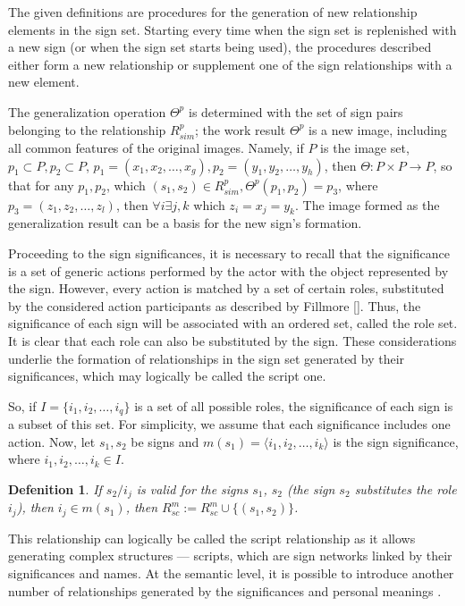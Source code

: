 \documentclass[review]{elsarticle}
\newtheorem{definition}{Defenition}
\begin{document}
The given definitions are procedures for the generation of new relationship elements in the sign set. Starting every time when the sign set is replenished with a new sign (or when the sign set starts being used), the procedures described either form a new relationship or supplement one of the sign relationships with a new element.

The generalization operation $\Theta^p$ is determined with the set of sign pairs belonging to the relationship $R^p_{sim}$; the work result $\Theta^p$ is a new image, including all common features of the original images. Namely, if $P$ is the image set, $p_1\subset P,p_2\subset P$, $p_1=(x_1,x_2,\dots,x_g), p_2=(y_1,y_2,\dots,y_h)$, then $\Theta:P\times P\rightarrow P$, so that for any $p_1,p_2$, which $(s_1,s_2)\in R^p_{sim}, \Theta^p(p_1,p_2)=p_3$, where $p_3=(z_1,z_2,\dots, z_l)$, then $\forall i\exists j,k$ which $z_i=x_j=y_k$. The image formed as the generalization result can be a basis for the new sign's formation.

Proceeding to the sign significances, it is necessary to recall that the significance is a set of generic actions performed by the actor with the object represented by the sign. However, every action is matched by a set of certain roles, substituted by the considered action participants as described by Fillmore []. Thus, the significance of each sign will be associated with an ordered set, called the role set. It is clear that each role can also be substituted by the sign. These considerations underlie the formation of relationships in the sign set generated by their significances, which may logically be called the script one.

So, if $I=\{i_1,i_2,\dots,i_q\}$ is a set of all possible roles, the significance of each sign is a subset of this set. For simplicity, we assume that each significance includes one action. Now, let $s_1, s_2$ be signs and $m(s_1)=\langle i_1,i_2,\dots,i_k \rangle$ is the sign significance, where $i_1,i_2,\dots,i_k\in I$.

\begin{definition}
	If $s_2 / i_j$ is valid for the signs $s_1$, $s_2$ (the sign $s_2$ substitutes the role $i_j$), then $i_j\in m(s_1)$, then $R^m_{sc}:=R^m_{sc}\cup\{(s_1,s_2)\}$.
\end{definition}

This relationship can logically be called the script relationship as it allows generating complex structures --- scripts, which are sign networks linked by their significances and names. At the semantic level, it is possible to introduce another number of relationships generated by the significances and personal meanings \cite{Osipov2014c}.
\end{document}
